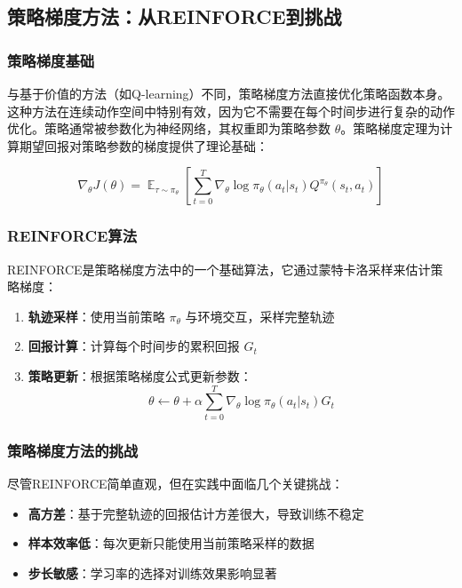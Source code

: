\documentclass[a4paper, 12pt]{article}
\DeclareMathOperator*{\E}{\mathbb{E}}    %
\begin{document}
\subsection{策略梯度方法：从REINFORCE到挑战}
\subsubsection{策略梯度基础}
与基于价值的方法（如Q-learning）不同，策略梯度方法直接优化策略函数本身。这种方法在连续动作空间中特别有效，因为它不需要在每个时间步进行复杂的动作优化。策略通常被参数化为神经网络，其权重即为策略参数 $\theta$。策略梯度定理为计算期望回报对策略参数的梯度提供了理论基础：

\begin{equation}
    \nabla_\theta J(\theta) = \E_{\tau \sim \pi_\theta}[\sum_{t=0}^{T} \nabla_\theta \log \pi_\theta(a_t|s_t) Q^{\pi_\theta}(s_t,a_t)]
\end{equation}

\subsubsection{REINFORCE算法}
REINFORCE是策略梯度方法中的一个基础算法，它通过蒙特卡洛采样来估计策略梯度：

\begin{enumerate}
    \item \textbf{轨迹采样}：使用当前策略 $\pi_\theta$ 与环境交互，采样完整轨迹
    \item \textbf{回报计算}：计算每个时间步的累积回报 $G_t$
    \item \textbf{策略更新}：根据策略梯度公式更新参数：
        \begin{equation}
            \theta \leftarrow \theta + \alpha \sum_{t=0}^{T} \nabla_\theta \log \pi_\theta(a_t|s_t) G_t
        \end{equation}
\end{enumerate}

\subsubsection{策略梯度方法的挑战}
尽管REINFORCE简单直观，但在实践中面临几个关键挑战：
\begin{itemize}
    \item \textbf{高方差}：基于完整轨迹的回报估计方差很大，导致训练不稳定
    \item \textbf{样本效率低}：每次更新只能使用当前策略采样的数据
    \item \textbf{步长敏感}：学习率的选择对训练效果影响显著
\end{itemize}
\end{document}
